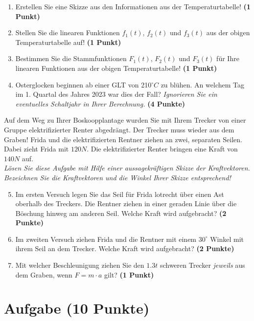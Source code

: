 \documentclass[a4paper, 9pt]{scrartcl}\usepackage[]{graphicx}\usepackage[]{xcolor}
\begin{document}
\begin{enumerate}
\item Erstellen Sie eine Skizze aus den Informationen aus der
  Temperaturtabelle!  \textbf{(1 Punkt)}
\item Stellen Sie die linearen Funktionen $f_1(t)$, $f_2(t)$ und
  $f_3(t)$ aus der obigen Temperaturtabelle auf!  \textbf{(1 Punkt)}
\item Bestimmen Sie die Stammfunktionen $F_1(t)$, $F_2(t)$ und $F_3(t)$ f{\"u}r
  Ihre linearen Funktionen aus der obigen Temperaturtabelle!  \textbf{(1
    Punkt)}
\item Osterglocken beginnen ab einer GLT von 210$^\circ C$ zu bl{\"u}hen. An
  welchem Tag im 1. Quartal des Jahres 2023 war dies der
  Fall? \textit{Ignorieren Sie ein eventuelles Schaltjahr in Ihrer Berechnung.} \textbf{(4 Punkte)}
\end{enumerate}

Auf dem Weg zu Ihrer Boskoopplantage wurden Sie mit Ihrem Trecker von
einer Gruppe elektrifizierter Renter abgedr{\"a}ngt. Der Trecker muss wieder
aus dem Graben! Frida und die elektrifizierten Rentner ziehen an zwei,
separaten Seilen. Dabei zieht Frida mit $120N$. Die
elektrifizierter Renter  bringen eine Kraft von $140N$ auf.\\

\textit{L{\"o}sen Sie diese Aufgabe mit Hilfe einer aussagekr{\"a}ftigen Skizze der
  Kraftvektoren. Bezeichnen Sie die Kraftvektoren und die Winkel Ihrer
  Skizze entsprechend!}

\begin{enumerate}
  \setcounter{enumi}{4}  
\item Im ersten Versuch legen Sie das Seil f{\"u}r Frida lotrecht {\"u}ber einen
  Ast oberhalb des Treckers. Die Rentner ziehen in einer geraden Linie {\"u}ber
  die B{\"o}schung hinweg am anderen Seil. Welche Kraft wird aufgebracht?
  \textbf{(2 Punkte)}
\item Im zweiten Versuch ziehen Frida und die Rentner mit einem
  $30^\circ$ Winkel mit ihrem Seil an dem Trecker. Welche Kraft
  wird aufgebracht? \textbf{(2 Punkte)}
\item Mit welcher Beschleunigung ziehen Sie den $1.3t$ schweren
  Trecker \textit{jeweils} aus dem Graben, wenn $F = m \cdot a$ gilt?
  \textbf{(1 Punkt)}
\end{enumerate}

 
\clearpage

\section{Aufgabe \hfill (10 Punkte)}
\end{document}
